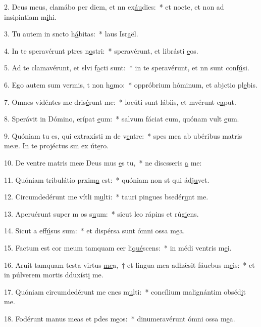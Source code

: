 2. Deus meus, clamábo per diem, et nn ex\uline{áu}dies:~* et nocte, et non ad insipintiam m\uline{i}hi.\par 
3. Tu autem in sncto h\uline{á}bitas:~* laus Isr\uline{a}ël.\par 
4. In te speravérunt ptres n\uline{o}stri:~* speravérunt, et librásti \uline{e}os.\par 
5. Ad te clamavérunt, et slvi f\uline{a}cti sunt:~* in te speravérunt, et nn sunt conf\uline{ú}si.\par 
6. Ego autem sum vermis, t non h\uline{o}mo:~* oppróbrium hóminum, et abjctio pl\uline{e}bis.\par 
7. Omnes vidéntes me dris\uline{é}runt me:~* locúti sunt lábiis, et mvérunt c\uline{a}put.\par 
8. Sperávit in Dómino, erípat \uline{e}um:~* salvum fáciat eum, quónam vult \uline{e}um.\par 
9. Quóniam tu es, qui extraxísti m de v\uline{e}ntre:~* spes mea ab ubéribus matris meæ. In te projéctus sm ex út\uline{e}ro.\par 
10. De ventre matris meæ Deus mus \uline{e}s tu,~* ne discsseris \uline{a} me:\par 
11. Quóniam tribulátio prxim\uline{a} est:~* quóniam non st qui ádj\uline{u}vet.\par 
12. Circumdedérunt me vítli m\uline{u}lti:~* tauri pingues bsedér\uline{u}nt me.\par 
13. Aperuérunt super m os s\uline{u}um:~* sicut leo rápins et rúg\uline{i}ens.\par 
14. Sicut a eff\uline{ú}sus sum:~* et dispérsa sunt ómni ossa m\uline{e}a.\par 
15. Factum est cor meum tamquam cer li\uline{qué}scens:~* in médi ventris m\uline{e}i.\par 
16. Aruit tamquam testa virtus \uline{me}a,~† et lingua mea adhǽsit fáucbus m\uline{e}is:~* et in púlverem mortis dduxíst\uline{i} me.\par 
17. Quóniam circumdedérunt me cnes m\uline{u}lti:~* concílium malignántim obséd\uline{i}t me.\par 
18. Fodérunt manus meas et pdes m\uline{e}os:~* dinumeravérunt ómni ossa m\uline{e}a.\par 
